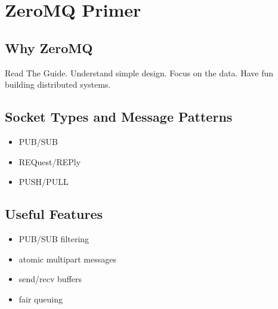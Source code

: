 \chapter{ZeroMQ Primer}
\label{zeromq_primer}

\section{Why ZeroMQ}

Read The Guide.
Understand simple design.
Focus on the data.
Have fun building distributed systems.

\section{Socket Types and Message Patterns}

\begin{itemize}
\item PUB/SUB
\item REQuest/REPly
\item PUSH/PULL
\end{itemize}

\section{Useful Features}

\begin{itemize}

\item PUB/SUB filtering
\item atomic multipart messages
\item send/recv buffers
\item fair queuing

\end{itemize}
